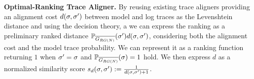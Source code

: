 		

\vspace{+0.2cm}
\noindent
\textbf{Optimal-Ranking Trace Aligner.}\label{subsec:eta}
By reusing existing trace aligners  \cite{DBLP:conf/edoc/AdriansyahDA11,LeoniM17} providing an alignment cost  $d(\sigma,{\sigma'})$ between model and log traces as the Levenshtein distance and
using the decision theory, a we can express the ranking as a preliminary ranked distance $\mathbb{P}_{\overline{G_{RG(N)}}}({\sigma'}) d(\sigma,{\sigma'})$, considering both the alignment cost and the model trace probability.
%
We can represent it 
as a ranking function %
returning $1$ when ${\sigma'}=\sigma$ and $\mathbb{P}_{\overline{G_{RG(N)}}}(\sigma)=1$ hold. We then express $d$ as
a normalized similarity score $s_d(\sigma,{\sigma'}):=\frac{1}{d(\sigma,{\sigma'})+1}$. %
